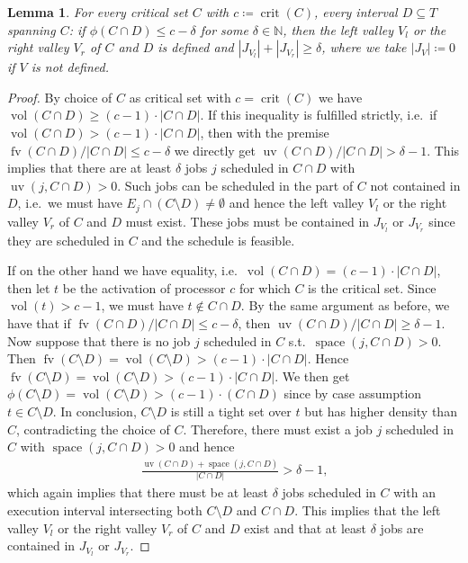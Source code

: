 \documentclass[a4paper]{article}
\DeclareMathOperator{\fv}{fv}
\DeclareMathOperator{\uv}{uv}
\DeclareMathOperator{\vol}{vol}
\DeclareMathOperator{\crit}{crit}
\DeclareMathOperator{\spac}{space}
\newtheorem{lemma}[theorem]{Lemma}
\begin{document}
\begin{lemma}\label{lemma:valley}
  For every critical set $C$ with $c \coloneqq \crit(C)$, every interval $D \subseteq T$ spanning $C$:
  if $\phi(C \cap D) \leq c - \delta$ for some $\delta \in \mathbb{N}$, then the left valley $V_l$ or the right valley $V_r$ of $C$ and $D$ is defined and $|J_{V_l}| + |J_{V_r}| \geq \delta$, where we take $|J_V| \coloneqq 0$ if $V$ is not defined.
\end{lemma}
\begin{proof}
  By choice of $C$ as critical set with $c = \crit(C)$ we have $\vol(C \cap D) \geq (c-1) \cdot |C \cap D|$.
  If this inequality is fulfilled strictly, i.e.\ if
  $\vol(C \cap D) > (c-1) \cdot |C \cap D|$, then with the premise
  $\fv(C \cap D) / |C \cap D| \leq c - \delta$ we directly get $\uv(C \cap D) / |C \cap D| > \delta - 1$.
  This implies that there are at least $\delta$ jobs $j$ scheduled in $C \cap D$ with $\uv(j, C \cap D) > 0$.
  Such jobs can be scheduled in the part of $C$ not contained in $D$, i.e.\ we must have $E_j \cap (C \setminus D) \neq \emptyset$ and hence the left valley $V_l$ or the right valley $V_r$ of $C$ and $D$ must exist.
  These jobs must be contained in $J_{V_l}$ or $J_{V_r}$ since they are scheduled in $C$ and the schedule is feasible.

  If on the other hand we have equality, i.e.\ $\vol(C \cap D) = (c-1) \cdot |C \cap D|$, then let $t$ be the activation of processor $c$ for which $C$ is the critical set.
  Since $\vol(t) > c-1$, we must have $t \notin C \cap D$.
  By the same argument as before, we have that if $\fv(C \cap D) / |C \cap D| \leq c - \delta$, then $\uv(C \cap D) / |C \cap D| \geq \delta - 1$.
  Now suppose that there is no job $j$ scheduled in $C$ s.t.\ $\spac(j, C \cap D) > 0$.
  Then $\fv(C \setminus D) = \vol(C \setminus D) > (c-1) \cdot | C \cap D|$.
  Hence $\fv(C \setminus D) = \vol(C \setminus D) > (c - 1) \cdot |C \cap D|$.
  We then get $\phi(C \setminus D) = \vol(C \setminus D) > (c-1) \cdot (C \cap D)$ since by case assumption $t \in C \setminus D$.
  In conclusion, $C \setminus D$ is still a tight set over $t$ but has higher density than $C$, contradicting the choice of $C$.
  Therefore, there must exist a job $j$ scheduled in $C$ with $\spac(j, C \cap D) > 0$ and hence
  \begin{align}
    \frac
    {\uv(C \cap D) + \spac(j, C \cap D)}
    {|C \cap D|}
    > \delta - 1 \text{,}
  \end{align}
  which again implies that there must be at least $\delta$ jobs scheduled in $C$ with an execution interval intersecting both $C \setminus D$ and $C \cap D$.
  This implies that the left valley $V_l$ or the right valley $V_r$ of $C$ and $D$ exist and that at least $\delta$ jobs are contained in $J_{V_l}$ or $J_{V_r}$.
\end{proof}
\end{document}
